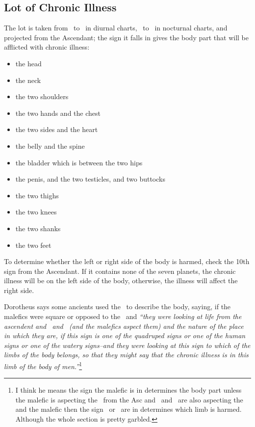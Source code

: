\subsection{Lot of Chronic Illness}
The  lot is taken from \Saturn\, to \Mars\, in diurnal charts, \Mars\, to \Saturn\, in nocturnal charts, and projected from the Ascendant; the sign it falls in gives the body part that will be afflicted with chronic illness:
\begin{itemize}[topsep=0em,itemsep=0em]
\item[\Aries]  the head
\item[\Taurus] the neck
\item[\Gemini] the two shoulders
\item[\Cancer] the two hands and the chest
\item[\Leo] the two sides and the heart
\item[\Virgo] the belly and the spine
\item[\Libra] the bladder which is between the two hips
\item[\Scorpio] the penis, and the two testicles, and two buttocks
\item[\Sagittarius] the two thighs
\item[\Capricorn] the two knees
\item[\Aquarius] the two shanks
\item[\Pisces] the two feet
\end{itemize}

To  determine whether the left or right side of the body is harmed, check the 10th sign from the Ascendant. If it contains none of the seven planets, the chronic illness will be on the left side of the body, otherwise, the illness will affect the right side.

Dorotheus  says some ancients used the \Moon\, to describe the body, saying, if the malefics were square or opposed to the \Moon\, and \textsl{``they were looking at life from the ascendent and \Venus\, and \Mercury\, (and the malefics aspect them) and the nature of the place in which they are, if this sign is one of the quadruped signs or one of the human signs or one of the watery signs--and they were looking at this sign to which of the limbs of the body belongs, so that they might say that the chronic illness is in this limb of the body of men.''}\footnote{I think he means the sign the malefic is in determines the body part unless the malefic is aspecting the \Moon\, from the Asc and \Venus\, and \Mercury\, are also aspecting the \Moon\, and the malefic then the sign \Venus\, or \Mercury\, are in determines which limb is harmed. Although the whole section is pretty garbled.}



